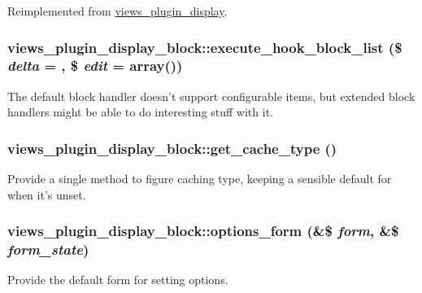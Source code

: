 Reimplemented from \hyperlink{classviews__plugin__display_af99c4a303d3e409ab7b14c6cfcd3a1d8}{views\_\-plugin\_\-display}.\hypertarget{classviews__plugin__display__block_a9d1df6840d9bda5c36020126332935cf}{
\subsubsection[{execute\_\-hook\_\-block\_\-list}]{\setlength{\rightskip}{0pt plus 5cm}views\_\-plugin\_\-display\_\-block::execute\_\-hook\_\-block\_\-list (\$ {\em delta} = {}, \/  \$ {\em edit} = {\ttfamily array()})}}
\label{classviews__plugin__display__block_a9d1df6840d9bda5c36020126332935cf}
The default block handler doesn't support configurable items, but extended block handlers might be able to do interesting stuff with it. \hypertarget{classviews__plugin__display__block_a4be2fbe3e5f223215268bdd13cdd0312}{
\subsubsection[{get\_\-cache\_\-type}]{\setlength{\rightskip}{0pt plus 5cm}views\_\-plugin\_\-display\_\-block::get\_\-cache\_\-type ()}}
\label{classviews__plugin__display__block_a4be2fbe3e5f223215268bdd13cdd0312}
Provide a single method to figure caching type, keeping a sensible default for when it's unset. \hypertarget{classviews__plugin__display__block_a251f0aa56cead04c51c4b1d633826640}{
\subsubsection[{options\_\-form}]{\setlength{\rightskip}{0pt plus 5cm}views\_\-plugin\_\-display\_\-block::options\_\-form (\&\$ {\em form}, \/  \&\$ {\em form\_\-state})}}
\label{classviews__plugin__display__block_a251f0aa56cead04c51c4b1d633826640}
Provide the default form for setting options. 

